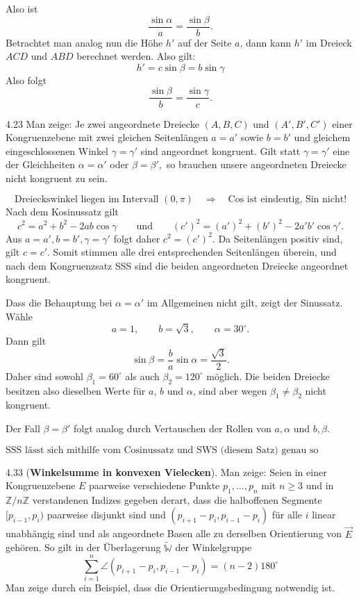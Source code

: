 Also ist
\[ \frac{\operatorname{sin}\alpha}{a} = \frac{\operatorname{sin}\beta}{b}.\]
Betrachtet man analog nun die Höhe $h'$ auf der Seite $a$, dann kann $h'$ im Dreieck $ACD$ und $ABD$ berechnet werden. Also gilt:
\[h' = c \operatorname{sin}\beta = b \operatorname{sin}\gamma\]
Also folgt
\[ \frac{\operatorname{sin}\beta}{b} = \frac{\operatorname{sin}\gamma}{c}.\]

\begin{exercise}{4.2}{3}
    Man zeige: Je zwei angeordnete Dreiecke
    \((A,B,C)\) und \((A',B',C')\)
    einer Kongruenzebene mit zwei gleichen Seitenlängen
    \(a=a'\) sowie \(b=b'\)
    und gleichem eingeschlossenen Winkel
    \(
        \gamma=\gamma'
    \)
    sind angeordnet kongruent.
    Gilt statt \(\gamma=\gamma'\) eine der Gleichheiten
    \(
        \alpha=\alpha'\) oder \(\beta=\beta',
    \)
    so brauchen unsere angeordneten Dreiecke nicht kongruent zu sein.
\end{exercise}

\[
    \boxed{\text{Dreieckswinkel liegen im Intervall } (0, \pi) \quad \Longrightarrow \quad \text{Cos ist eindeutig, Sin nicht!}}
\]
Nach dem Kosinussatz gilt
\[
    c^2=a^2+b^2-2ab\cos\gamma \qquad \text{und} \qquad
    (c')^2=(a')^2+(b')^2-2a'b'\cos\gamma'.
\]
Aus \(a=a', b=b', \gamma=\gamma'\)
folgt daher \(c^2=(c')^2.\)
Da Seitenlängen positiv sind, gilt \(c=c'\). Somit stimmen alle drei
entsprechenden Seitenlängen überein, und nach dem Kongruenzsatz SSS sind
die beiden angeordneten Dreiecke angeordnet kongruent.

Dass die Behauptung bei \(\alpha=\alpha'\) im Allgemeinen nicht gilt,
zeigt der Sinussatz. Wähle
\[
    a=1,\qquad b=\sqrt3,\qquad \alpha=30^\circ.
\]
Dann gilt
\[
    \sin\beta
    =
    \frac{b}{a}\sin\alpha
    =
    \frac{\sqrt3}{2}.
\]
Daher sind sowohl \(\beta_1=60^\circ\) als auch \(\beta_2=120^\circ\) möglich.
Die beiden Dreiecke besitzen also dieselben Werte für \(a\), \(b\) und
\(\alpha\), sind aber wegen \(\beta_1\neq \beta_2\) nicht kongruent.

Der Fall \(\beta=\beta'\) folgt analog durch Vertauschen der Rollen von
\(a,\alpha\) und \(b,\beta\).

\[
    \boxed{\text{SSS lässt sich mithilfe vom Cosinussatz und SWS (diesem Satz) genau so beweisen!}}
\]

\begin{exercise}{4.3}{3}
    (\textbf{Winkelsumme in konvexen Vielecken}). Man zeige: Seien in einer
    Kongruenzebene $E$ paarweise verschiedene Punkte $p_1, ... , p_n$ mit $n \geq 3$ und
    in $\mathbb Z/n\mathbb Z$ verstandenen Indizes gegeben derart, dass die halboffenen Segmente
    $[p_{i-1}, p_i)$ paarweise disjunkt sind und $(p_{i+1} - p_i, p_{i-1} - p_i)$ für alle $i$ linear unabhängig sind und als angeordnete Basen alle zu derselben Orientierung von $\vec{E}$
    gehören. So gilt in der Überlagerung $\tilde{\mathbb W}$ der Winkelgruppe
    \[
        \sum_{i=1}^{n}\angle (p_{i+1}-p_i, p_{i-1}-p_i) = (n-2) 180^\circ
    \]
    Man zeige durch ein Beispiel, dass die Orientierungsbedingung notwendig ist.
\end{exercise}

